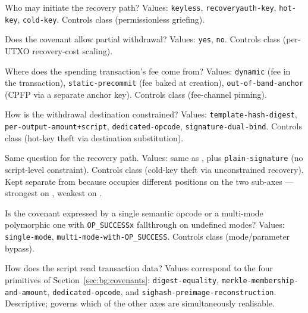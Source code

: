 \begin{description}[leftmargin=1.5em,itemsep=1pt,parsep=0pt,topsep=2pt]
  \item[\axauthf{} --- Recovery authorisation.] Who may initiate the
    recovery path? Values: \texttt{keyless}, \texttt{recoveryauth-key},
    \texttt{hot-key}, \texttt{cold-key}. Controls class \classgrief{}
    (permissionless griefing).
  \item[\axrevaultf{} --- Revault support.] Does the covenant allow
    partial withdrawal? Values: \texttt{yes}, \texttt{no}. Controls
    class \classscale{} (per-UTXO recovery-cost scaling).
  \item[\axfeef{} --- Fee-inclusion model.] Where does the spending
    transaction's fee come from? Values: \texttt{dynamic} (fee in the
    transaction), \texttt{static-precommit} (fee baked at creation),
    \texttt{out-of-band-anchor} (CPFP via a separate anchor key).
    Controls class \classfee{} (fee-channel pinning).
  \item[\axwdbind{} --- Withdrawal-destination binding.] How is the
    withdrawal destination constrained? Values:
    \texttt{template-hash-digest}, \texttt{per-output-amount+script},
    \texttt{dedicated-opcode}, \texttt{signature-dual-bind}. Controls
    class \classhot{} (hot-key theft via destination substitution).
  \item[\axrecbind{} --- Recovery-destination binding.] Same question
    for the recovery path. Values: same as \axwdbind{}, plus
    \texttt{plain-signature} (no script-level constraint). Controls
    class \classcold{} (cold-key theft via unconstrained recovery).
    Kept separate from \axwdbind{} because \catcsfs{} occupies
    different positions on the two sub-axes --- strongest on
    \axwdbind{}, weakest on \axrecbind{}.
  \item[\axopsurf{} --- Opcode surface.] Is the covenant expressed by
    a single semantic opcode or a multi-mode polymorphic one with
    \texttt{OP\_SUCCESSx} fallthrough on undefined modes? Values:
    \texttt{single-mode}, \texttt{multi-mode-with-OP\_SUCCESS}.
    Controls class \classmode{} (mode/parameter bypass).
  \item[\axintro{} --- Introspection primitive.] How does the script
    read transaction data? Values correspond to the four primitives of
    Section~\ref{sec:bg:covenants}:
    \texttt{digest-equality},
    \texttt{merkle-membership-and-amount},
    \texttt{dedicated-opcode}, and
    \texttt{sighash-preimage-reconstruction}. Descriptive; governs
    which of the other axes are simultaneously realisable.
\end{description}

